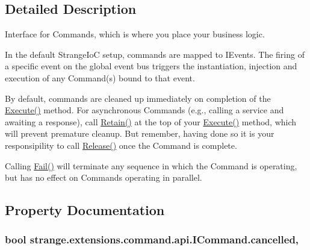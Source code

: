 \subsection{Detailed Description}
Interface for Commands, which is where you place your business logic. 

In the default Strange\-Io\-C setup, commands are mapped to I\-Events. The firing of a specific event on the global event bus triggers the instantiation, injection and execution of any Command(s) bound to that event.

By default, commands are cleaned up immediately on completion of the {\ttfamily \hyperlink{interfacestrange_1_1extensions_1_1command_1_1api_1_1_i_command_a49ddf3bbaf19624534fa99fa4725feca}{Execute()}} method. For asynchronous Commands (e.\-g., calling a service and awaiting a response), call {\ttfamily \hyperlink{interfacestrange_1_1extensions_1_1command_1_1api_1_1_i_command_ae24532aa617e2bee62a3798b59b78458}{Retain()}} at the top of your {\ttfamily \hyperlink{interfacestrange_1_1extensions_1_1command_1_1api_1_1_i_command_a49ddf3bbaf19624534fa99fa4725feca}{Execute()}} method, which will prevent premature cleanup. But remember, having done so it is your responsipility to call {\ttfamily \hyperlink{interfacestrange_1_1extensions_1_1command_1_1api_1_1_i_command_a462054fd8e17e6139f9739e32d4d6ced}{Release()}} once the Command is complete.

Calling {\ttfamily \hyperlink{interfacestrange_1_1extensions_1_1command_1_1api_1_1_i_command_a1ad585b6fcc3e4dad5823100a62d9053}{Fail()}} will terminate any sequence in which the Command is operating, but has no effect on Commands operating in parallel. 

\subsection{Property Documentation}
\hypertarget{interfacestrange_1_1extensions_1_1command_1_1api_1_1_i_command_a213e1477e49f74dbbaa9a85887af4b5b}{
\subsubsection[{cancelled}]{\setlength{\rightskip}{0pt plus 5cm}bool strange.\-extensions.\-command.\-api.\-I\-Command.\-cancelled\hspace{0.3cm}{\ttfamily [get]}, {\ttfamily [set]}}}\label{interfacestrange_1_1extensions_1_1command_1_1api_1_1_i_command_a213e1477e49f74dbbaa9a85887af4b5b}


